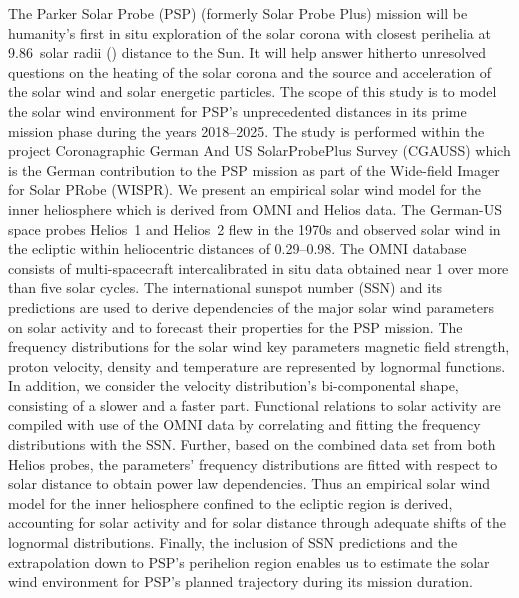 
% 
% 
% 
% 
\abstracty
{The Parker Solar Probe (PSP) (formerly Solar Probe Plus) mission will be humanity’s first in situ exploration of the solar corona with closest perihelia at \num{9.86}~solar radii (\si{\Rs}) distance to the Sun. It will help answer hitherto unresolved questions on the heating of the solar corona and the source and acceleration of the solar wind and solar energetic particles. The scope of this study is to model the solar wind environment for PSP’s unprecedented distances in its prime mission phase during the years \numrange{2018}{2025}. The study is performed within the project Coronagraphic German And US SolarProbePlus Survey (CGAUSS) which is the German contribution to the PSP mission as part of the Wide-field Imager for Solar PRobe (WISPR).}	%
{We present an empirical solar wind model for the inner heliosphere which is derived from OMNI and Helios data. The German-US space probes Helios~1 and Helios~2 flew in the 1970s and observed solar wind in the ecliptic within heliocentric distances of \SIrange{0.29}{0.98}{\au}. The OMNI database consists of multi-spacecraft intercalibrated in situ data obtained near \SI{1}{\au} over more than five solar cycles. The international sunspot number (SSN) and its predictions are used to derive dependencies of the major solar wind parameters on solar activity and to forecast their properties for the PSP mission.}	%
{The frequency distributions for the solar wind key parameters magnetic field strength, proton velocity, density and temperature are represented by lognormal functions. In addition, we consider the velocity distribution’s bi-componental shape, consisting of a slower and a faster part. Functional relations to solar activity are compiled with use of the OMNI data by correlating and fitting the frequency distributions with the SSN. Further, based on the combined data set from both Helios probes, the parameters’ frequency distributions are fitted with respect to solar distance to obtain power law dependencies. Thus an empirical solar wind model for the inner heliosphere confined to the ecliptic region is derived, accounting for solar activity and for solar distance through adequate shifts of the lognormal distributions. Finally, the inclusion of SSN predictions and the extrapolation down to PSP’s perihelion region enables us to estimate the solar wind environment for PSP’s planned trajectory during its mission duration.}	%
